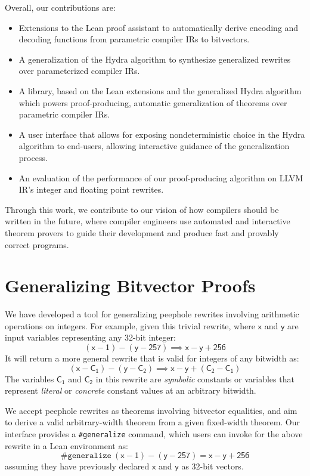 \documentclass[review, anonymous, acmsmall]{acmart}
\newcommand{\blockmath}[1]{\[\mathsf{#1}\]}
\newcommand{\inline}[1]{$\mathsf{#1}$}
\begin{document}
Overall, our contributions are:
\begin{itemize}
	\item Extensions to the Lean proof assistant to automatically derive encoding
    and decoding functions from parametric compiler IRs to bitvectors.
	\item A generalization of the Hydra algorithm to synthesize generalized rewrites over parameterized compiler IRs.
	\item A library, based on the Lean extensions and the generalized Hydra algorithm which powers
    proof-producing, automatic generalization of theorems over parametric compiler IRs.
  \item A user interface that allows for exposing nondeterministic choice in the
    Hydra algorithm to end-users, allowing interactive guidance of the generalization process.
  \item An evaluation of the performance of our proof-producing algorithm on LLVM IR's integer and floating point rewrites.
\end{itemize}

Through this work, we contribute to our vision of how compilers should be written in the future,
where compiler engineers use automated and interactive theorem provers to guide their development and produce fast and provably correct programs.

\section{Generalizing Bitvector Proofs}

We have developed a tool for generalizing peephole rewrites involving arithmetic operations on integers. For example, given this trivial rewrite, where \inline{x} and \inline{y} are input variables representing any 32-bit integer:
\blockmath{(x - 1) - (y - 257) \implies x - y + 256}
It will return a more general rewrite that is valid for integers of any bitwidth as:  
\blockmath{(x - C_1) - (y - C_2) \implies x - y + (C_2 - C_1)}
The variables \inline{C_1} and \inline{C_2} in this rewrite are \textit{symbolic} constants or variables that represent \textit{literal} or \textit{concrete} constant values at an arbitrary bitwidth. 

We accept peephole rewrites as theorems involving bitvector equalities, and aim to derive a valid arbitrary-width theorem from a given fixed-width theorem. Our interface provides a \texttt{\#generalize} command, which users can invoke for the above rewrite in a Lean environment as:
\blockmath{\texttt{\#generalize}\ (x - 1) - (y - 257) = x - y + 256}
assuming they have previously declared \inline{x} and \inline{y} as 32-bit vectors.
\end{document}
